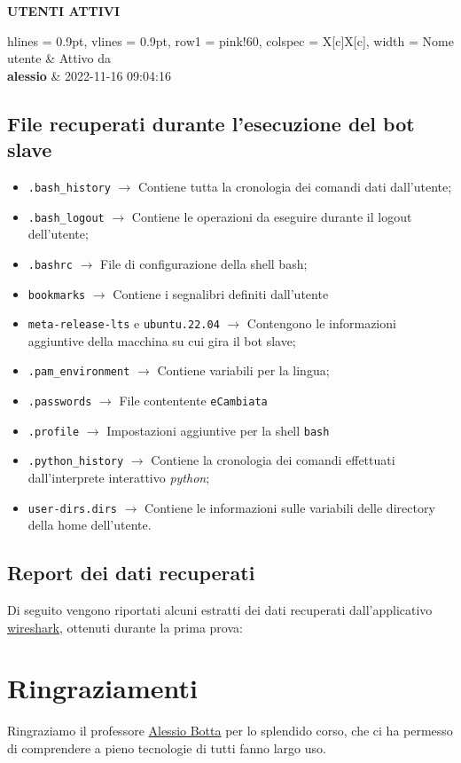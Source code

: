 \documentclass[letterpaper, 11pt]{article}
\begin{document}

\begin{center}
    \textbf{UTENTI ATTIVI}
\end{center}

\begin{tblr}{hlines = {0.9pt}, vlines = {0.9pt}, row{1} = {pink!60}, colspec = {X[c]X[c]}, width = \textwidth}
        Nome utente & Attivo da\\

        \textbf{alessio} & 2022-11-16 09:04:16
\end{tblr}
\subsection{File recuperati durante l'esecuzione del bot slave}
\label{File recuperati}
\begin{itemize}
\item \texttt{.bash\_history} \(\rightarrow\) Contiene tutta la cronologia dei comandi dati dall'utente;
\item \texttt{.bash\_logout} \(\rightarrow\) Contiene le operazioni da eseguire durante il logout dell'utente;
\item \texttt{.bashrc} \(\rightarrow\) File di configurazione della shell bash;
\item \texttt{bookmarks} \(\rightarrow\) Contiene i segnalibri definiti dall'utente
\item \texttt{meta-release-lts}  e \texttt{ubuntu.22.04} \(\rightarrow\) Contengono le informazioni aggiuntive della macchina su cui gira il bot slave;
\item \texttt{.pam\_environment} \(\rightarrow\) Contiene variabili per la lingua;
\item \texttt{.passwords} \(\rightarrow\) File contentente \texttt{eCambiata}
\item \texttt{.profile} \(\rightarrow\) Impostazioni aggiuntive per la shell \texttt{bash}
\item \texttt{.python\_history} \(\rightarrow\) Contiene la cronologia dei comandi effettuati dall'interprete interattivo \emph{python};
\item \texttt{user-dirs.dirs} \(\rightarrow\) Contiene le informazioni sulle variabili delle directory della home dell'utente.
\end{itemize}
\subsection{Report dei dati recuperati}
\label{Report dati}
Di seguito vengono riportati alcuni estratti dei dati recuperati dall'applicativo \href{https://www.wireshark.org/}{wireshark}, ottenuti durante la prima prova:
\section{Ringraziamenti}
\label{Ringraziamenti}
Ringraziamo il professore \href{mailto:a.botta@unina.it}{Alessio Botta} per lo splendido corso, che ci ha permesso di comprendere a pieno tecnologie di tutti fanno largo uso.
\end{document}
